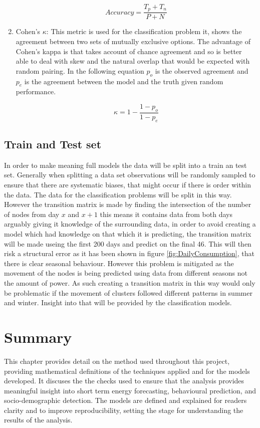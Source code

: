 \begin{enumerate}
    \begin{equation}
        Accuracy = \frac{T_p +T_n}{P+N}
    \end{equation}
    
    \item Cohen's $\kappa$: This metric is used for the classification problem it, shows the agreement between two sets of mutually exclusive options. The advantage of Cohen's kappa is that takes account of chance agreement and so is better able to deal with skew and the natural overlap that would be expected with random pairing. In the following equation $p_o$ is the observed agreement and $p_e$ is the agreement between the model and the truth given random performance.
    
    \begin{equation}
        \kappa = 1-\frac{1-p_o}{1-p_e}
    \end{equation}
    
\end{enumerate}

\subsection{Train and Test set}
In order to make meaning full models the data will be split into a train an test set. Generally when splitting a data set observations will be randomly sampled to ensure that there are systematic biases, that might occur if there is order within the data. The data for the classification problems will be split in this way. However the transition matrix is made by finding the intersection of the number of nodes from day $x$ and $x+1$ this means it contains data from both days arguably giving it knowledge of the surrounding data, in order to avoid creating a model which had knowledge on that which it is predicting, the transition matrix will be made useing the first 200 days and predict on the final 46. This will then risk a structural error as it has been shown in figure \ref{fig:DailyConsumption}, that there is clear seasonal behaviour. However this problem is mitigated as the movement of the nodes is being predicted using data from different seasons not the amount of power. As such creating a transition matrix in this way would only be problematic if the movement of clusters followed different patterns in summer and winter. Insight into that will be provided by the classification models.

\section{Summary}

This chapter provides detail on the method used throughout this project, providing mathematical definitions of the techniques applied and for the models developed. It discuses the the checks used to ensure that the analysis provides meaningful insight into short term energy forecasting, behavioural prediction, and socio-demographic detection. The models are defined and explained for readers clarity and to improve reproducibility, setting the stage for understanding the results of the analysis.


